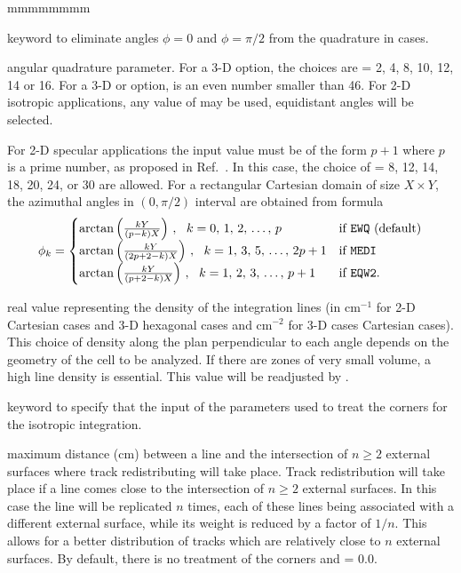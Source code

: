\begin{ListeDeDescription}{mmmmmmmm}
\item[\moc{EQW2}] keyword to eliminate angles $\phi=0$ and $\phi=\pi/2$ from the  quadrature in  cases.

\item[\dusa{nangl}] angular quadrature parameter. For a 3-D  option, the choices are  = 2, 4, 8, 10, 12, 14 
or 16. For a 3-D  or  option,  is an even number smaller than 46.\cite{ige260} For 2-D 
isotropic applications, any value of  may be used, equidistant angles will be selected.

For 2-D specular applications the input value must be of the form $p + 1$ where $p$ is a prime number, as proposed
in Ref.~. In this case, the choice of  = 8, 12, 14, 18, 20, 24, or 30 are allowed. For
a rectangular Cartesian domain of size $X \times Y$, the azimuthal angles in $(0,\pi/2)$ interval are obtained from formula
\begin{align*}
\phi_k=\begin{cases}
\arctan\left(\frac{kY}{(p-k)X}\right)  \, , \ \ k=0,\, 1,\, 2,\, \dots, \, p & \text{if {\tt EWQ} (default)}\\
\arctan\left(\frac{kY}{(2p+2-k)X}\right) \, , \ \ k=1,\, 3,\, 5, \, \dots, \, 2p+1 & \text{if {\tt MEDI}} \\
\arctan\left(\frac{kY}{(p+2-k)X}\right) \, , \ \ k=1,\, 2,\, 3, \, \dots, \, p+1 &\text{if {\tt EQW2}.}\\
\end{cases}
\end{align*}

\item[\dusa{dens}] real value representing the density of the integration lines (in cm$^{-1}$ for 2-D Cartesian cases and 
3-D hexagonal cases and cm$^{-2}$ for 3-D cases Cartesian cases). This choice of density along the 
plan perpendicular to each angle depends on the geometry of the cell to be analyzed. If there 
are zones of very small volume, a high line density is essential. This value will be readjusted by 
.

\item[\moc{CORN}] keyword to specify that the input of the parameters used to treat the corners for the isotropic 
integration. 

\item[\dusa{pcorn}] maximum distance (cm) between a line and the intersection of $n\ge 2$ external surfaces where 
track redistributing will take place. Track redistribution will take place if a line comes close to 
the intersection of $n \ge 2$ external surfaces. In this case the line will be replicated $n$ times, each 
of these lines being associated with a different external surface, while its weight is reduced by 
a factor of $1/n$. This allows for a better distribution of tracks which are relatively close to $n$ 
external surfaces. By default, there is no treatment of the corners and  = 0.0.


\end{ListeDeDescription}
